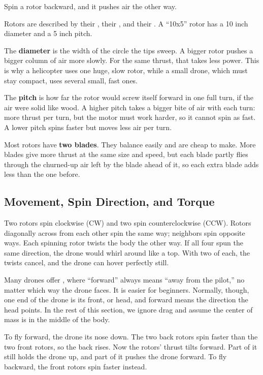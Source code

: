 Spin a rotor backward, and it pushes air the other way.

Rotors are described by their
, their , and their . A ``10x5'' rotor has a 10 inch diameter and a 5 inch pitch.

The \textbf{diameter} is the width of the circle the tips sweep. A bigger
rotor pushes a bigger column of air more slowly. For the same thrust, that
takes less power. This is why a helicopter uses one huge, slow rotor, while
a small drone, which must stay compact, uses several small, fast ones.

The \textbf{pitch} is how far the rotor would screw itself forward in one
full turn, if the air were solid like wood. A higher pitch takes a bigger
bite of air with each turn: more thrust per turn, but the motor must work
harder, so it cannot spin as fast. A lower pitch spins faster but moves
less air per turn.

Most rotors have \textbf{two blades}. They balance easily and are cheap to
make. More blades give more thrust at the same size and speed, but each
blade partly flies through the churned-up air left by the blade ahead of
it, so each extra blade adds less than the one before.

\subsection{Movement, Spin Direction, and Torque}
Two rotors spin clockwise (CW) and two spin counterclockwise (CCW). Rotors
diagonally across from each other spin the same way; neighbors spin
opposite ways. Each spinning rotor twists the body the other way. If all
four spun the same direction, the drone would whirl around like a top.
With two of each, the twists cancel, and the drone can hover perfectly
still.

Many drones offer , where
``forward'' always means ``away from the pilot,'' no matter which way the
drone faces. It is easier for beginners. Normally, though, one end of the
drone is its front, or head, and forward means the direction the head
points. In the rest of this section, we ignore drag and assume the center
of mass is in the middle of the body.

To fly forward, the drone  its nose down. The two back
rotors spin faster than the two front rotors, so the back rises. Now the
rotors' thrust tilts forward. Part of it still holds the drone up, and part
of it pushes the drone forward. To fly backward, the front rotors spin
faster instead.

